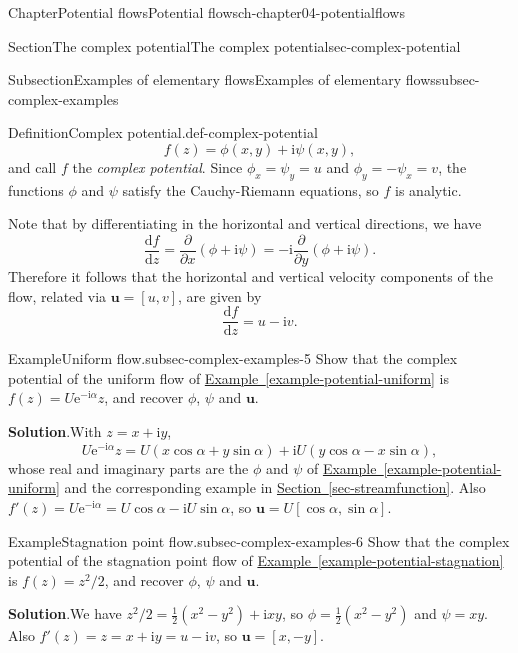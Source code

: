 \documentclass[oneside,10pt,]{book}
\newcommand{\blocktitlefont}{\relax}
\newcommand{\xreffont}{\relax}
\numberwithin{equation}{section}
\newcommand{\e}{\mathrm{e}}
\newcommand{\im}{\mathrm{i}}
\newcommand{\de}{\mathrm{d}}
\newcommand{\dd}[2]{\frac{\de#1}{\de#2}}
\newcommand{\pd}[2]{\frac{\partial#1}{\partial#2}}
\newcommand{\bu}{\boldsymbol{u}}
\begin{document}
\begin{chapterptx}{Chapter}{Potential flows}{}{Potential flows}{}{}{ch-chapter04-potentialflows}
\begin{sectionptx}{Section}{The complex potential}{}{The complex potential}{}{}{sec-complex-potential}
\begin{subsectionptx}{Subsection}{Examples of elementary flows}{}{Examples of elementary flows}{}{}{subsec-complex-examples}
\begin{definition}{Definition}{Complex potential.}{}{def-complex-potential}
\begin{equation}
f(z) = \phi(x, y) + \im \psi(x, y),\label{eqn-complex-potential}
\end{equation}
and call \(f\) the \emph{complex potential}. Since \(\phi_x = \psi_y = u\) and \(\phi_y = -\psi_x = v\), the functions \(\phi\) and \(\psi\) satisfy the Cauchy-Riemann equations, so \(f\) is analytic.%
\par
Note that by differentiating in the horizontal and vertical directions, we have%
\begin{equation*}
\dd{f}{z} = \pd{}{x} (\phi + \im \psi) = -\im \pd{}{y} (\phi + \im \psi). 
\end{equation*}
Therefore it follows that the horizontal and vertical velocity components of the flow, related via \(\bu = [u, v]\), are given by%
\begin{equation}
\dd{f}{z} = u - \im v.\label{eqn-complex-velocity}
\end{equation}
%
\end{definition}
\begin{example}{Example}{Uniform flow.}{subsec-complex-examples-5}%
Show that the complex potential of the uniform flow of \hyperref[example-potential-uniform]{Example~{\xreffont\ref{example-potential-uniform}}} is \(f(z) = U \e^{-\im \alpha} z\), and recover \(\phi\), \(\psi\) and \(\bu\).%
\par\smallskip%
\noindent\textbf{\blocktitlefont Solution}.\hypertarget{subsec-complex-examples-5-4}{}\quad{}With \(z = x + \im y\),%
\begin{equation*}
U\e^{-\im\alpha}z = U(x\cos\alpha + y\sin\alpha) + \im U(y\cos\alpha - x\sin\alpha),
\end{equation*}
whose real and imaginary parts are the \(\phi\) and \(\psi\) of \hyperref[example-potential-uniform]{Example~{\xreffont\ref{example-potential-uniform}}} and the corresponding example in \hyperref[sec-streamfunction]{Section~{\xreffont\ref{sec-streamfunction}}}. Also \(f'(z) = U\e^{-\im\alpha} = U\cos\alpha - \im U\sin\alpha\), so \(\bu = U[\cos\alpha, \sin\alpha]\).%
\end{example}
\begin{example}{Example}{Stagnation point flow.}{subsec-complex-examples-6}%
Show that the complex potential of the stagnation point flow of \hyperref[example-potential-stagnation]{Example~{\xreffont\ref{example-potential-stagnation}}} is \(f(z) = z^2/2\), and recover \(\phi\), \(\psi\) and \(\bu\).%
\par\smallskip%
\noindent\textbf{\blocktitlefont Solution}.\hypertarget{subsec-complex-examples-6-4}{}\quad{}We have \(z^2/2 = \frac12(x^2 - y^2) + \im xy\), so \(\phi = \frac12(x^2 - y^2)\) and \(\psi = xy\). Also \(f'(z) = z = x + \im y = u - \im v\), so \(\bu = [x, -y]\).%

\end{example}
\end{subsectionptx}
\end{sectionptx}
\end{chapterptx}
\end{document}
